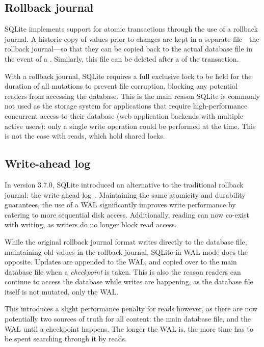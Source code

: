 \subsection{Rollback journal}\label{sec:sqlite-locks}
SQLite implements support for atomic transactions through the use of a rollback
journal. A historic copy of values prior to changes are kept in a separate
file---the rollback journal---so that they can be copied back to the actual
database file in the event of a . Similarly, this file can be
deleted after a  of the transaction.

With a rollback journal, SQLite requires a full exclusive lock to be held for
the duration of all mutations to prevent file corruption, blocking any potential
readers from accessing the database. This is the main reason SQLite is commonly
not used as the storage system for applications that require high-performance
concurrent access to their database (\eg web application backends with multiple
active users): only a single write operation could be performed at the time.
This is not the case with reads, which hold shared locks.

\subsection{Write-ahead log}\label{sec:sqlite-wal}
In version 3.7.0, SQLite introduced an alternative to the traditional rollback
journal: the write-ahead log~\cite{sqlite-wal}. Maintaining the same atomicity
and durability guarantees, the use of a WAL significantly improves write
performance by catering to more sequential disk access. Additionally, reading
can now co-exist with writing, as writers do no longer block read access.

While the original rollback journal format writes directly to the database file,
maintaining old values in the rollback journal, SQLite in WAL-mode does the
opposite. Updates are appended to the WAL, and copied over to the main database
file when a \textit{checkpoint} is taken. This is also the reason readers can
continue to access the database while writes are happening, as the database file
itself is not mutated, only the WAL.\@

This introduces a slight performance penalty for reads however, as there are now
potentially two sources of truth for all content: the main database file, and
the WAL until a checkpoint happens. The longer the WAL is, the more time has to
be spent searching through it by reads.

